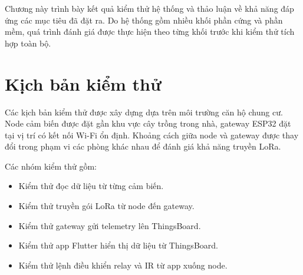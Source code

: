 Chương này trình bày kết quả kiểm thử hệ thống và thảo luận về khả năng đáp ứng các mục tiêu đã đặt ra. Do hệ thống gồm nhiều khối phần cứng và phần mềm, quá trình đánh giá được thực hiện theo từng khối trước khi kiểm thử tích hợp toàn bộ.

\section{Kịch bản kiểm thử}
Các kịch bản kiểm thử được xây dựng dựa trên môi trường căn hộ chung cư. Node cảm biến được đặt gần khu vực cây trồng trong nhà, gateway ESP32 đặt tại vị trí có kết nối Wi-Fi ổn định. Khoảng cách giữa node và gateway được thay đổi trong phạm vi các phòng khác nhau để đánh giá khả năng truyền LoRa.

Các nhóm kiểm thử gồm:
\begin{itemize}
    \item Kiểm thử đọc dữ liệu từ từng cảm biến.
    \item Kiểm thử truyền gói LoRa từ node đến gateway.
    \item Kiểm thử gateway gửi telemetry lên ThingsBoard.
    \item Kiểm thử app Flutter hiển thị dữ liệu từ ThingsBoard.
    \item Kiểm thử lệnh điều khiển relay và IR từ app xuống node.
\end{itemize}
